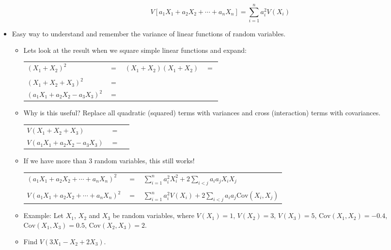 \documentclass{article}
\newcommand{\cov}[1]{\mathrm{Cov}(#1)}		%
\begin{document}
\begin{itemize}
\begin{enumerate}[(i)]
        \[V[a_1 X_1 + a_2 X_2+ \cdots + a_n X_n] = \sum_{i = 1}^n a_i^2 V(X_i)\]
    \end{enumerate}
    \item Easy way to understand and remember the variance of linear functions of random variables.
    \begin{itemize}
        \item Lets look at the result when we square simple linear functions and expand:\vspace{20pt}\\
        \begin{tabular}{l l l l}
            $(X_1 + X_2)^2$ & $=$ & $(X_1 + X_2) (X_1 + X_2)$ & $=$ \\\\
            $(X_1 + X_2 + X_3)^2$ & $=$ & & \vspace{60pt}\\
            $(a_1 X_1 + a_2 X_2 - a_3 X_3)^2$ & $=$ & & \\
        \end{tabular}\vspace{40pt}
        \item Why is this useful? Replace all quadratic (squared) terms with variances and cross (interaction) terms with covariances.\bigskip\\
        \begin{tabular}{l l l}
            $V(X_1 + X_2 + X_3)$ & $=$ \vspace{40pt}\\
            $V(a_1 X_1 + a_2 X_2 - a_3 X_3)$ & $=$ \\
        \end{tabular}\bigskip\newpage
        \item If we have more than 3 random variables, this still works!\bigskip\\
        \begin{tabular}{l l l}
            $(a_1 X_1 + a_2 X_2 + \cdots + a_n X_n)^2$ & $=$ & $\displaystyle \sum_{i = 1}^n a_i^2 X_i^2 + 2 \sum_{i < j} a_i a_j X_i X_j$ \\\\
            $V(a_1 X_1 + a_2 X_2 + \cdots + a_n X_n)^2$ & $=$ & $\displaystyle \sum_{i = 1}^n a_i^2 V(X_i) + 2 \sum_{i < j} a_i a_j \cov{X_i, X_j}$ \\
        \end{tabular}\bigskip
        \item Example: Let $X_1$, $X_2$ and $X_3$ be random variables, where 
$V(X_1) = 1$, $V(X_2) = 3$, $V(X_3) = 5$, $\cov{X_1,X_2} =-0.4$, $\cov{X_1,X_3} = 0.5$, $\cov{X_2,X_3} = 2$.
    \item[] Find $V(3 X_1 - X_2 + 2 X_3)$.\vspace{150pt}
    \end{itemize}
\end{itemize}\bigskip
\end{document}
